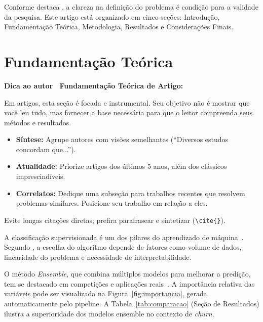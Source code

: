 \documentclass[
    article,
    12pt,
    oneside,
    a4paper,
    english,
    brazilian
    ]{abntex2}
\numberwithin{equation}{section}
\newenvironment{dica}{%
    \par\medskip
    \color{blue!60!black}\small\itshape
}{%
    \par\medskip
}
\begin{document}
Conforme destaca , a clareza na definição do problema é condição para a validade da pesquisa. Este artigo está organizado em cinco seções: Introdução, Fundamentação Teórica, Metodologia, Resultados e Considerações Finais.

\section{Fundamentação Teórica}

\begin{dica}
\noindent\textbf{Dica ao autor \textemdash\ Fundamentação Teórica de Artigo:}

Em artigos, esta seção é focada e instrumental. Seu objetivo não é mostrar que você leu tudo, mas fornecer a base necessária para que o leitor compreenda seus métodos e resultados.
\begin{itemize}
    \item \textbf{Síntese:} Agrupe autores com visões semelhantes (``Diversos estudos \cite{autorA, autorB, autorC} concordam que...'').
    \item \textbf{Atualidade:} Priorize artigos dos últimos 5 anos, além dos clássicos imprescindíveis.
    \item \textbf{Correlatos:} Dedique uma subseção para trabalhos recentes que resolvem problemas similares. Posicione seu trabalho em relação a eles.
\end{itemize}
Evite longas citações diretas; prefira parafrasear e sintetizar (\texttt{\textbackslash cite\{\}}).
\end{dica}

A classificação supervisionada é um dos pilares do aprendizado de máquina~\cite{hastie2009}. Segundo , a escolha do algoritmo depende de fatores como volume de dados, linearidade do problema e necessidade de interpretabilidade.

O método \textit{Ensemble}, que combina múltiplos modelos para melhorar a predição, tem se destacado em competições e aplicações reais~\cite{breiman2001}. A importância relativa das variáveis pode ser visualizada na Figura~\ref{fig:importancia}, gerada automaticamente pelo pipeline. A Tabela~\ref{tab:comparacao} (Seção de Resultados) ilustra a superioridade dos modelos ensemble no contexto de \textit{churn}.
\end{document}
